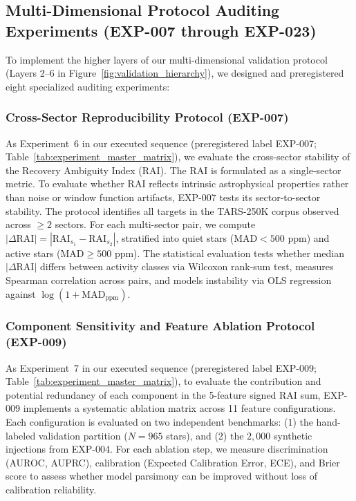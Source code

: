 \subsection{Multi-Dimensional Protocol Auditing Experiments (EXP-007 through EXP-023)} \label{sec:method_audits_overview}
To implement the higher layers of our multi-dimensional validation protocol (Layers 2--6 in Figure~\ref{fig:validation_hierarchy}), we designed and preregistered eight specialized auditing experiments:

\subsubsection{Cross-Sector Reproducibility Protocol (EXP-007)} \label{sec:method_exp007_protocol}
As Experiment~6 in our executed sequence (preregistered label EXP-007; Table~\ref{tab:experiment_master_matrix}), we evaluate the cross-sector stability of the Recovery Ambiguity Index (RAI). The RAI is formulated as a single-sector metric. To evaluate whether RAI reflects intrinsic astrophysical properties rather than noise or window function artifacts, EXP-007 tests its sector-to-sector stability. The protocol identifies all targets in the TARS-250K corpus observed across $\ge 2$ sectors. For each multi-sector pair, we compute $|\Delta\text{RAI}| = |\text{RAI}_{s_1} - \text{RAI}_{s_2}|$, stratified into quiet stars ($\text{MAD} < 500\text{ ppm}$) and active stars ($\text{MAD} \ge 500\text{ ppm}$). The statistical evaluation tests whether median $|\Delta\text{RAI}|$ differs between activity classes via Wilcoxon rank-sum test, measures Spearman correlation across pairs, and models instability via OLS regression against $\log(1 + \text{MAD}_{\text{ppm}})$.

\subsubsection{Component Sensitivity and Feature Ablation Protocol (EXP-009)} \label{sec:method_exp009_protocol}
As Experiment~7 in our executed sequence (preregistered label EXP-009; Table~\ref{tab:experiment_master_matrix}), to evaluate the contribution and potential redundancy of each component in the 5-feature signed RAI sum, EXP-009 implements a systematic ablation matrix across 11 feature configurations. Each configuration is evaluated on two independent benchmarks: (1) the hand-labeled validation partition ($N=965$ stars), and (2) the $2{,}000$ synthetic injections from EXP-004. For each ablation step, we measure discrimination (AUROC, AUPRC), calibration (Expected Calibration Error, ECE), and Brier score to assess whether model parsimony can be improved without loss of calibration reliability.

